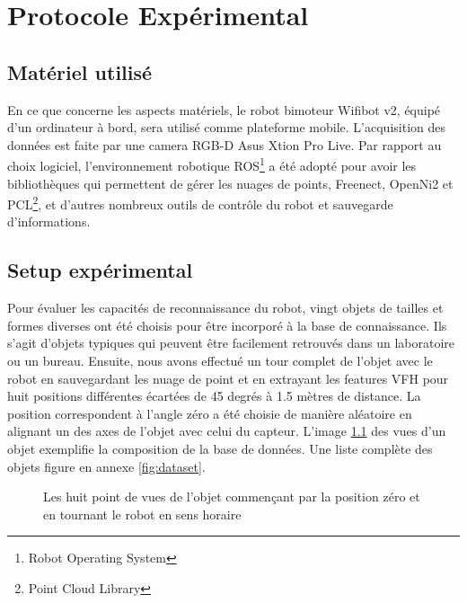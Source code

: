 \chapter {Protocole Expérimental}

\section{Matériel utilisé}
En ce que concerne les aspects matériels, le robot bimoteur Wifibot v2, équipé d'un ordinateur à bord, sera utilisé comme plateforme mobile. L'acquisition des données est faite par une camera RGB-D Asus Xtion Pro Live. Par rapport au choix logiciel, l'environnement robotique ROS\footnote{Robot Operating System} a été adopté pour avoir les bibliothèques qui permettent de gérer les nuages de points, Freenect, OpenNi2 et PCL\footnote{Point Cloud Library}, et d'autres nombreux outils de contrôle du robot et sauvegarde d'informations.

\section{Setup expérimental}
Pour évaluer les capacités de reconnaissance du robot, vingt objets de tailles et formes diverses ont été choisis pour être incorporé à la base de connaissance. Ils s'agit d'objets typiques qui peuvent être facilement retrouvés dans un laboratoire ou un bureau. Ensuite, nous avons effectué un tour complet de l'objet avec le robot en sauvegardant les nuage de point et en extrayant les features VFH pour huit positions différentes écartées de 45 degrés à 1.5 mètres de distance. La position correspondent à l'angle zéro a été choisie de manière aléatoire en alignant un des axes de l'objet avec celui du capteur. L'image \ref{fig:setup_expe} des vues d'un objet exemplifie la composition de la base de données. Une liste complète des objets figure en annexe \ref{fig:dataset}.

\begin{figure}[H]
	\caption{Les huit point de vues de l'objet commençant par la position zéro et en tournant le robot en sens horaire}
	\label{fig:setup_expe}
\end{figure}

